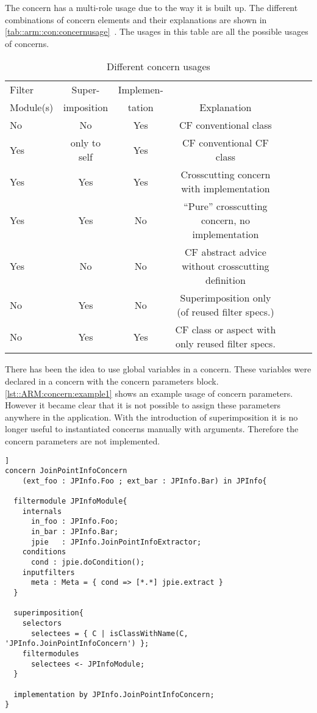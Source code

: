 The \Compose* concern has a multi-role usage due to the way it is built up.
The different combinations of concern elements and their explanations are shown in \autoref{tab::arm::con:concernusage}~\cite{bergmans:aosdbook05}.
The usages in this table are all the possible usages of concerns. 

\begin{table*}[tpb]
\begin{center}
	\centering
		\begin{tabular}{I c | c | c I l I} \hline
		Filter& Super- & Implemen- &  \\
		Module(s)& imposition & tation & Explanation\\ \hline
		No  & No	& Yes	& CF conventional class\\ \hline
	  Yes & only to self & Yes & CF conventional CF class\\ \hline
	  Yes & Yes & Yes	& Crosscutting concern with implementation\\ \hline
	  Yes & Yes & No	& ``Pure'' crosscutting concern, no implementation\\ \hline
	  Yes & No  & No 	& CF abstract advice without crosscutting definition\\ \hline
	  No  & Yes	& No 	& Superimposition only (of reused filter specs.)\\ \hline
	  No  & Yes	& Yes & CF class or aspect with only reused filter specs.\\ \hline
	 	\end{tabular}
	\caption{Different concern usages}
	\label{tab::arm::con:concernusage}
\end{center}
\end{table*}

There has been the idea to use global variables in a concern. 
These variables were declared in a concern with the concern parameters block. 
\autoref{lst::ARM:concern:example1} shows an example usage of concern parameters.
However it became clear that it is not possible to assign these parameters anywhere in the application.
With the introduction of superimposition it is no longer useful to instantiated concerns manually with arguments.
Therefore the concern parameters are not implemented.

\begin{lstlisting}[caption={JoinPointInfoConcern from the JoinPointInformation example },label=lst::ARM:concern:example1,style=listing,language=ComposeStar,float=[tpb]]
concern JoinPointInfoConcern
    (ext_foo : JPInfo.Foo ; ext_bar : JPInfo.Bar) in JPInfo{

  filtermodule JPInfoModule{
    internals
      in_foo : JPInfo.Foo;
      in_bar : JPInfo.Bar;
      jpie   : JPInfo.JoinPointInfoExtractor;
    conditions
      cond : jpie.doCondition();
    inputfilters
      meta : Meta = { cond => [*.*] jpie.extract }
  }

  superimposition{
    selectors
      selectees = { C | isClassWithName(C, 'JPInfo.JoinPointInfoConcern') };
    filtermodules
      selectees <- JPInfoModule;
  }

  implementation by JPInfo.JoinPointInfoConcern;
}
\end{lstlisting}
